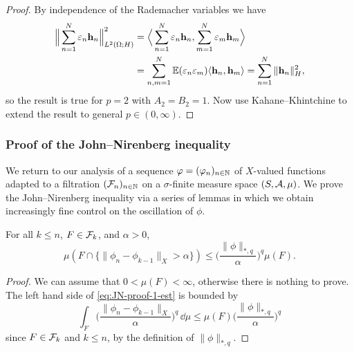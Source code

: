 \begin{proof}
  By independence of the Rademacher variables we have
  \begin{equation}
    \begin{aligned}
      \Big\| \sum_{n=1}^N \varepsilon_n \mathbf{h}_n \Big\|_{L^2(\Omega;H)}^2
      &= \Big\langle \sum_{n=1}^N \varepsilon_n \mathbf{h}_n , \sum_{m=1}^N \varepsilon_m \mathbf{h}_m \Big\rangle \\
      &= \sum_{n,m = 1}^N \mathbb{E}(\varepsilon_n \varepsilon_m) \langle \mathbf{h}_n, \mathbf{h}_m \rangle 
      = \sum_{n=1}^N \|\mathbf{h}_{n}\|_{H}^2,
    \end{aligned}
  \end{equation}
  so the result is true for $p=2$ with $A_2 = B_2 = 1$.
  Now use Kahane--Khintchine to extend the result to general $p \in (0,\infty)$.
\end{proof}

\subsubsection{Proof of the John--Nirenberg inequality}

We return to our analysis of a sequence $\varphi = (\varphi_n)_{n \in \mathbb{N}}$ of $X$-valued functions adapted to a filtration $(\mathcal{F}_n)_{n \in \mathbb{N}}$ on a $\sigma$-finite measure space $(S,\mathcal{A},\mu)$.
We prove the John--Nirenberg inequality via a series of lemmas in which we obtain increasingly fine control on the oscillation of $\phi$.

\begin{lem}\label{lem:JN-proof-1}
  For all $k \leq n$, $F \in \mathcal{F}_k$, and $\alpha > 0$,
  \begin{equation}\label{eq:JN-proof-1-est}
    \mu(F \cap \{ \|\phi_n - \phi_{k-1}\|_{X} > \alpha \}) \leq \Big( \frac{\|\phi\|_{*,q}}{\alpha} \Big)^{q} \mu(F).
  \end{equation}
\end{lem}

\begin{proof}
  We can assume that $0 < \mu(F) < \infty$, otherwise there is nothing to prove.
  The left hand side of \eqref{eq:JN-proof-1-est} is bounded by
  \begin{equation*}
    \int_{F} \Big( \frac{\|\phi_n - \phi_{k-1}\|_{X}}{\alpha} \Big)^{q} \, \dd\mu \leq \mu(F) \Big( \frac{\|\phi\|_{*,q}}{\alpha} \Big)^{q}
  \end{equation*}
  since $F \in \mathcal{F}_k$ and $k \leq n$, by the definition of $\|\phi\|_{*,q}$.
\end{proof}

